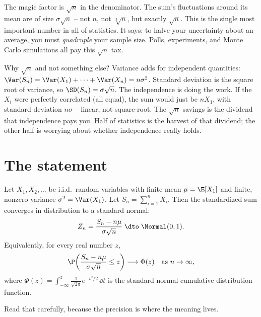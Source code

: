 \begin{focusbox}
The magic factor is $\sqrt{n}$ in the denominator. The sum's fluctuations around its
mean are of size $\sigma\sqrt{n}$ -- not $n$, not $\sqrt[3]{n}$, but exactly $\sqrt{n}$.
This is the single most important number in all of statistics. It says: to halve your
uncertainty about an average, you must \emph{quadruple} your sample size. Polls,
experiments, and Monte Carlo simulations all pay this $\sqrt{n}$ tax.
\end{focusbox}

\begin{whybox}
Why $\sqrt{n}$ and not something else? Variance adds for independent quantities:
$\Var(S_n) = \Var(X_1) + \cdots + \Var(X_n) = n\sigma^2$. Standard deviation is the
square root of variance, so $\SD(S_n) = \sigma\sqrt{n}$. The independence is doing the
work. If the $X_i$ were perfectly correlated (all equal), the sum would just be $nX_1$,
with standard deviation $n\sigma$ -- linear, not square-root. The $\sqrt{n}$ savings is
the dividend that independence pays you. Half of statistics is the harvest of that
dividend; the other half is worrying about whether independence really holds.
\end{whybox}

\section{The statement}
\label{ch21:statement}

\begin{theorem}
\label{ch21:thm-clt}
Let $X_1, X_2, \dots$ be i.i.d.\ random variables with finite mean $\mu = \E[X_1]$ and
finite, nonzero variance $\sigma^2 = \Var(X_1)$. Let $S_n = \sum_{i=1}^n X_i$. Then the
standardized sum converges in distribution to a standard normal:
\[
  Z_n = \frac{S_n - n\mu}{\sigma\sqrt{n}} \;\dto\; \Normal(0,1).
\]
Equivalently, for every real number $z$,
\[
  \P\!\left( \frac{S_n - n\mu}{\sigma\sqrt{n}} \le z \right) \longrightarrow \Phi(z)
  \quad \text{as } n \to \infty,
\]
where $\Phi(z) = \int_{-\infty}^{z} \frac{1}{\sqrt{2\pi}} e^{-t^2/2}\,\dd t$ is the
standard normal cumulative distribution function.
\end{theorem}

Read that carefully, because the precision is where the meaning lives.

